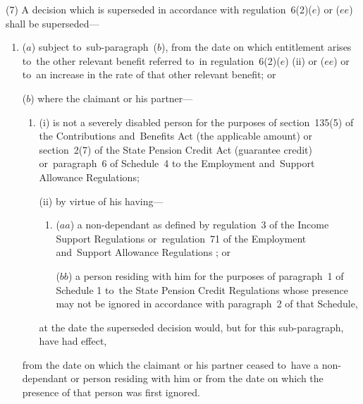\documentclass[12pt,a4paper]{article}
\begin{document}



(7) A decision which is superseded in accordance with regulation~6(2)($e$)  or ($ee$)  shall be superseded—
\begin{enumerate}\item[]
($a$) subject to~sub-paragraph~($b$), from the date on which entitlement arises to~the other relevant benefit referred to~in regulation~6(2)($e$) (ii)  or ($ee$)  or to~an increase in the rate of that other relevant benefit; or

($b$) where the claimant or his partner—
\begin{enumerate}\item[]
(i) is not a severely disabled person for the purposes of section~135(5) of the Contributions and~Benefits Act (the applicable amount) or section~2(7) of the State Pension Credit Act (guarantee credit)
or~paragraph~6 of Schedule~4 to the Employment and~Support Allowance Regulations;  %

(ii) by virtue of his having—
\begin{enumerate}\item[]
($aa$) a non-dependant as defined by regulation~3 of the Income Support Regulations
or~regulation~71 of the Employment and~Support Allowance Regulations%
; or

($bb$) a person residing with him for the purposes of paragraph~1 of Schedule 1 to~the State Pension Credit Regulations whose presence may not be ignored in accordance with paragraph~2 of that Schedule,
\end{enumerate}
at the date the superseded decision would, but for this sub-paragraph, have had effect,
\end{enumerate}
from the date on which the claimant or his partner ceased to~have a non-dependant or person residing with him or from the date on which the presence of that person was first ignored.
\end{enumerate}
\end{document}
